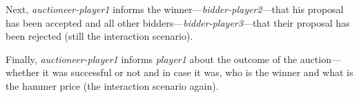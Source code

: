 Next, \textit{auctioneer-player1} informs the winner---\textit{bidder-player2}---that his proposal has been accepted and all other bidders---\textit{bidder-player3}---that their proposal has been rejected (still the {} interaction scenario).

Finally, \textit{auctioneer-player1} informs \textit{player1} about the outcome of the auction---whether it was successful or not and in case it was, who is the winner and what is the hammer price (the {} interaction scenario again).